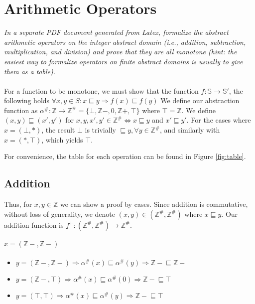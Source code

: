 \documentclass{article}
\begin{document}
\section{Arithmetic Operators}
\emph{In a separate PDF document generated from Latex, formalize the abstract arithmetic operators on the integer abstract domain (i.e., addition, subtraction, multiplication, and division) and prove that they are all monotone (hint: the easiest way to formalize operators on finite abstract domains is usually to give them as a table).
}
\\\\
For a function to be monotone, we must show that the function $f:\mathbb{S}\rightarrow \mathbb{S'}$, the following holds $\forall x,y \in S : x \sqsubseteq y \Rightarrow f(x) \sqsubseteq f(y)$
We define our abstraction function as $\alpha^{\#}:\mathbb{Z}\rightarrow \mathbb{Z^\#} = \mathbb{\{\bot,Z-,}0\mathbb{,Z+,\top\}}$ where $\top = \mathbb{Z}$.
We define $(x,y) \sqsubseteq (x',y')$ for $x,y,x',y' \in \mathbb{Z^\#} \iff x \sqsubseteq y$ and $x' \sqsubseteq y'$.  For the cases where $x = (\bot,*)$, the result $\bot$ is trivially $\sqsubseteq y, \forall y \in \mathbb{Z^\#}$, and similarly with $x = (*,\top)$, which yields $\top$.

For convenience, the table for each operation can be found in Figure \ref{fig:table}.

\subsection{Addition}
Thus, for $x,y \in \mathbb{Z}$ we can show a proof by cases.  
Since addition is commutative, without loss of generality, we denote $(x,y) \in (\mathbb{Z^\#},\mathbb{Z^\#})$ where $x \sqsubseteq y$.
Our addition function is $f^{+}:(\mathbb{Z^\#},\mathbb{Z^\#})\rightarrow\mathbb{Z^\#}$.
\paragraph{$x = (\mathbb{Z-},\mathbb{Z-})$}
\begin{itemize}
\item $y = (\mathbb{Z-},\mathbb{Z-}) \Rightarrow \alpha^{\#}(x) \sqsubseteq \alpha^{\#}(y) \Rightarrow \mathbb{Z-} \sqsubseteq \mathbb{Z-}$
\item $y = (\mathbb{Z-},\top) \Rightarrow \alpha^{\#}(x) \sqsubseteq \alpha^{\#}(0) \Rightarrow \mathbb{Z-} \sqsubseteq \top$
\item $y = (\top,\top) \Rightarrow \alpha^{\#}(x) \sqsubseteq \alpha^{\#}(y) \Rightarrow \mathbb{Z-} \sqsubseteq \top$
\end{itemize}
\end{document}
